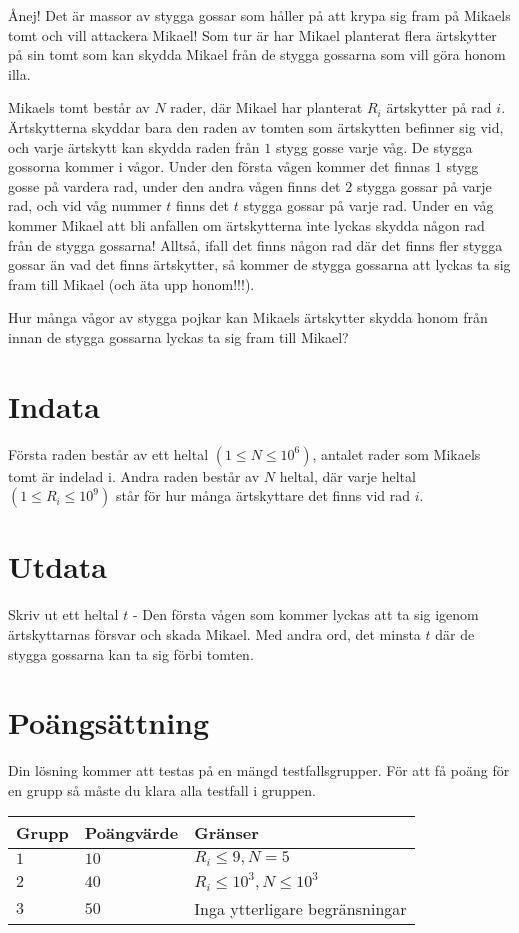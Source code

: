 \noindent
Ånej! Det är massor av stygga gossar som håller på att krypa sig fram på Mikaels tomt och vill attackera Mikael!
Som tur är har Mikael planterat flera ärtskytter på sin tomt som kan skydda Mikael från de stygga gossarna som vill göra honom illa.

\noindent
Mikaels tomt består av $N$ rader, där Mikael har planterat $R_i$ ärtskytter på rad $i$. Ärtskytterna skyddar bara den raden av tomten som ärtskytten befinner sig vid, och varje ärtskytt kan skydda raden från $1$ stygg gosse varje våg.
De stygga gossorna kommer i vågor. Under den första vågen kommer det finnas $1$ stygg gosse på vardera rad, under den andra vågen finns det $2$ stygga gossar på varje rad, och vid våg nummer $t$ finns det $t$ stygga gossar på varje rad.
Under en våg kommer Mikael att bli anfallen om ärtskytterna inte lyckas skydda någon rad från de stygga gossarna! 
Alltså, ifall det finns någon rad där det finns fler stygga gossar än vad det finns ärtskytter, så kommer de stygga gossarna att lyckas ta sig fram till Mikael (och äta upp honom!!!).

\noindent
Hur många vågor av stygga pojkar kan Mikaels ärtskytter skydda honom från innan de stygga gossarna lyckas ta sig fram till Mikael?

\section*{Indata}
\noindent
Första raden består av ett heltal $(1 \leqslant N \leqslant 10^6)$, antalet rader som Mikaels tomt är indelad i.
Andra raden består av $N$ heltal, där varje heltal $(1 \leqslant R_i \leqslant 10^9)$ står för hur många ärtskyttare det finns vid rad $i$. 

\section*{Utdata}
\noindent
Skriv ut ett heltal $t$ - Den första vågen som kommer lyckas att ta sig igenom ärtskyttarnas försvar och skada Mikael. Med andra ord, det minsta $t$ där de stygga gossarna kan ta sig förbi tomten.

\section*{Poängsättning}
Din lösning kommer att testas på en mängd testfallsgrupper.
\noindent
För att få poäng för en grupp så måste du klara alla testfall i gruppen.

\noindent
\begin{tabular}{| l | l | l |}
\hline
  Grupp & Poängvärde & Gränser \\ \hline
  $1$    & $10$       &  $R_i \leqslant 9, N = 5$ \\ \hline
  $2$    & $40$       &  $R_i \leqslant 10^3, N \leqslant 10^3$ \\ \hline
  $3$    & $50$       &  Inga ytterligare begränsningar \\ \hline
\end{tabular}
